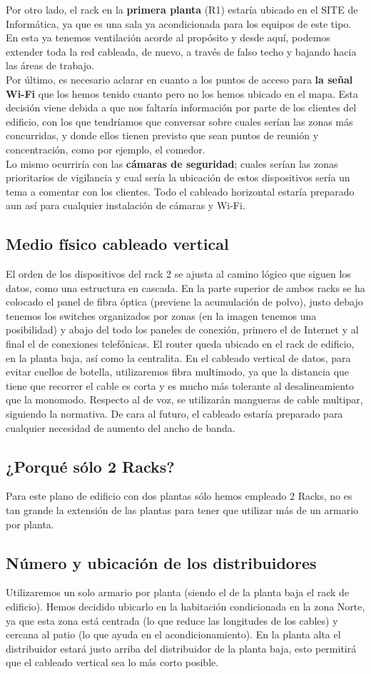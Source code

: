 Por otro lado, el  rack en la \textbf{primera planta} (R1) estaría ubicado en el SITE de Informática, ya que es una sala ya acondicionada para los equipos de este tipo. En esta ya tenemos ventilación acorde al propósito y desde aquí, podemos extender toda la red cableada, de nuevo, a través de falso techo y bajando hacia las áreas de trabajo.\\

Por último, es necesario aclarar en cuanto a los puntos de acceso para \textbf{la señal Wi-Fi} que los hemos tenido cuanto pero no los hemos ubicado en el mapa. Esta decisión viene debida a que nos faltaría información por parte de los clientes del edificio, con los que tendríamos que conversar sobre cuales serían las zonas más concurridas, y donde ellos tienen previsto que sean puntos de reunión y concentración, como por ejemplo, el comedor.\\ Lo mismo ocurriría con las \textbf{cámaras de seguridad}; cuales serían las zonas prioritarios de vigilancia y cual sería la ubicación de estos dispositivos sería un tema a comentar con los clientes. Todo el cableado horizontal estaría preparado aun así para cualquier instalación de cámaras y Wi-Fi.
\subsection{Medio físico cableado vertical}
El orden de los dispositivos del rack 2 se ajusta al camino lógico que siguen los datos, como una estructura en cascada. En la parte superior de ambos racks se ha colocado el panel de fibra óptica (previene la acumulación de polvo), justo debajo tenemos los switches organizados por zonas (en la imagen tenemos una posibilidad) y abajo del todo los paneles de conexión, primero el de Internet y al final el de conexiones telefónicas. El router queda ubicado en el rack de edificio, en la planta baja, así como la centralita. En el cableado vertical de datos, para evitar cuellos de botella, utilizaremos fibra multimodo, ya que la distancia que tiene que recorrer el cable es corta y es mucho más tolerante al desalineamiento que la monomodo. Respecto al de voz, se utilizarán mangueras de cable multipar, siguiendo la normativa. De cara al futuro, el cableado estaría preparado para cualquier necesidad de aumento del ancho de banda.
\subsection{¿Porqué sólo 2 Racks?}
Para este plano de edificio con dos plantas sólo hemos empleado 2 Racks, no es tan grande la extensión de las plantas para tener que utilizar más de  un armario por planta.
\subsection{Número y ubicación de los distribuidores}
Utilizaremos un solo armario por planta (siendo el de la planta baja el rack de edificio). Hemos decidido ubicarlo en la habitación condicionada en la zona Norte, ya que esta zona está centrada (lo que reduce las longitudes de los cables) y cercana al patio (lo que ayuda en el acondicionamiento). En la planta alta el distribuidor estará justo arriba del distribuidor de la planta baja, esto permitirá que el cableado vertical sea lo más corto posible.